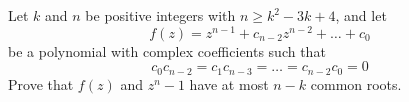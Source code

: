 Let $k$ and $n$ be positive integers with $n\geq k^2-3k+4$, and let
$$f(z)=z^{n-1}+c_{n-2}z^{n-2}+\dots+c_0$$be a polynomial with complex coefficients such that
$$c_0c_{n-2}=c_1c_{n-3}=\dots=c_{n-2}c_0=0$$Prove that $f(z)$ and $z^n-1$ have at most $n-k$ common roots.